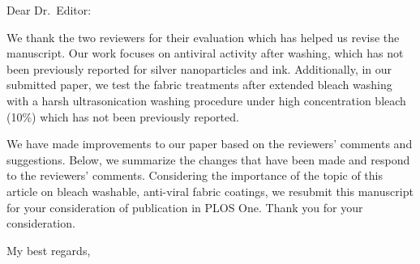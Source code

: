 \documentclass[12pt]{letter}
\date{\today}
\begin{document}
\begin{letter}{}

\opening{Dear Dr.~Editor:}

We thank the two reviewers for their evaluation which has helped us revise the manuscript.  %
Our work focuses on antiviral activity after washing, which has not been previously reported for silver nanoparticles and ink.  
Additionally, in our submitted paper, we test the fabric treatments after extended bleach washing with a harsh ultrasonication washing procedure under high concentration bleach (10\%) which has not been previously reported. 



We have made improvements to our paper based on the reviewers' comments and suggestions.
Below, we summarize the changes that have been made and respond to the reviewers' comments.
Considering the importance of the topic of this
article on 
bleach washable, anti-viral fabric coatings,
we resubmit this manuscript for your consideration of publication in PLOS One.
Thank you for your consideration.

\closing{My best regards,}




\end{letter}







\end{document}
